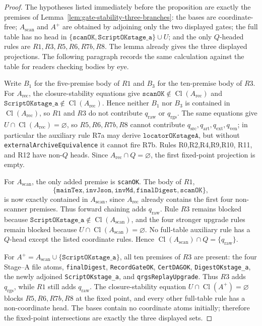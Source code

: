 \documentclass[runningheads]{llncs}
\newcommand{\rawBeginTokenCoord}{q_{\mathrm{raw}}}
\newcommand{\qlex}{\rawBeginTokenCoord}
\newcommand{\qrgs}{q_{\mathrm{rgs}}}
\newcommand{\qsrc}{q_{\mathrm{src}}}
\newcommand{\qart}{q_{\mathrm{art}}}
\newcommand{\qext}{q_{\mathrm{ext}}}
\newcommand{\qven}{q_{\mathrm{ven}}}
\begin{document}
\begin{proof}
The hypotheses listed immediately before the proposition are exactly the
premises of Lemma~\ref{lem:gate-stability-three-branches}: the bases are
coordinate-free; \(A_{\mathrm{scan}}\) and \(A^{+}\) are obtained by adjoining
only the two displayed gates; the full table has no head in
\(\{\texttt{scanOK},\texttt{ScriptOKstage\_a}\}\cup U\); and the only
\(Q\)-headed rules are \(R1,R3,R5,R6,R7b,R8\).  The lemma already gives the
three displayed projections.  The following paragraph records the same
calculation against the table for readers checking bodies by eye.

Write \(B_1\) for
the five-premise body of \(R1\) and \(B_3\) for the ten-premise body of \(R3\).
For \(A_{\mathrm{rec}}\), the closure-stability equations give
\(\texttt{scanOK}\notin\operatorname{Cl}(A_{\mathrm{rec}})\) and
\(\texttt{ScriptOKstage\_a}\notin\operatorname{Cl}(A_{\mathrm{rec}})\).  Hence
neither \(B_1\) nor \(B_3\) is contained in
\(\operatorname{Cl}(A_{\mathrm{rec}})\), so \(R1\) and \(R3\) do not contribute
\(\qlex\) or \(\qrgs\).  The same equations give
\(U\cap\operatorname{Cl}(A_{\mathrm{rec}})=\varnothing\), so \(R5,R6,R7b,R8\)
cannot contribute \(\qsrc,\qart,\qext,\qven\); in particular the auxiliary rule
R7a may derive \(\texttt{locatorOKstageA}\), but without
\texttt{externalArchiveEquivalence} it cannot fire R7b.  Rules R0,R2,R4,R9,R10,
R11, and R12 have non-\(Q\) heads.  Since \(A_{\mathrm{rec}}\cap Q=\varnothing\),
the first fixed-point projection is empty.

For \(A_{\mathrm{scan}}\), the only added premise is \texttt{scanOK}.  The body
of \(R1\),
\[
\{\texttt{mainTex},\texttt{invJson},\texttt{invMd},
\texttt{finalDigest},\texttt{scanOK}\},
\]
is now exactly contained in \(A_{\mathrm{scan}}\), since
\(A_{\mathrm{rec}}\) already contains the first four non-scanner premises.  Thus
forward chaining adds \(\qlex\).  Rule \(R3\) remains blocked because
\(\texttt{ScriptOKstage\_a}\notin\operatorname{Cl}(A_{\mathrm{scan}})\), and
the four stronger upgrade rules remain blocked because
\(U\cap\operatorname{Cl}(A_{\mathrm{scan}})=\varnothing\).  No full-table
auxiliary rule has a \(Q\)-head except the listed coordinate rules.  Hence
\(\operatorname{Cl}(A_{\mathrm{scan}})\cap Q=\{\qlex\}\).

For \(A^{+}=A_{\mathrm{scan}}\cup\{\texttt{ScriptOKstage\_a}\}\), all ten
premises of \(R3\) are present: the four Stage--A file atoms, \texttt{finalDigest},
\texttt{RecordGateOK}, \texttt{CertDAGOK}, \texttt{DigestOKstage\_a}, the newly
adjoined \texttt{ScriptOKstage\_a}, and \texttt{qrgsReplayUpgrade}.  Thus \(R3\)
adds \(\qrgs\), while \(R1\) still adds \(\qlex\).  The closure-stability
equation \(U\cap\operatorname{Cl}(A^{+})=\varnothing\) blocks
\(R5,R6,R7b,R8\) at the fixed point, and every other full-table rule has a
non-coordinate head.  The bases contain no coordinate atoms initially; therefore
the fixed-point intersections are exactly the three displayed sets.
\end{proof}
\end{document}
